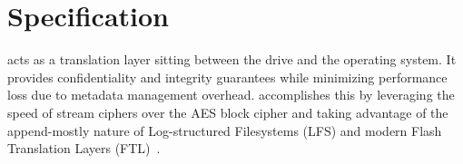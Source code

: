 \section{Specification} \label{sec:specification}

\SYSTEM{} acts as a translation layer sitting between the drive and the
operating system. It provides confidentiality and integrity guarantees while
minimizing performance loss due to metadata management overhead. \SYSTEM{}
accomplishes this by leveraging the speed of stream ciphers over the AES block
cipher and taking advantage of the append-mostly nature of Log-structured
Filesystems (LFS) and modern Flash Translation Layers (FTL)~\cite{SSD}.
